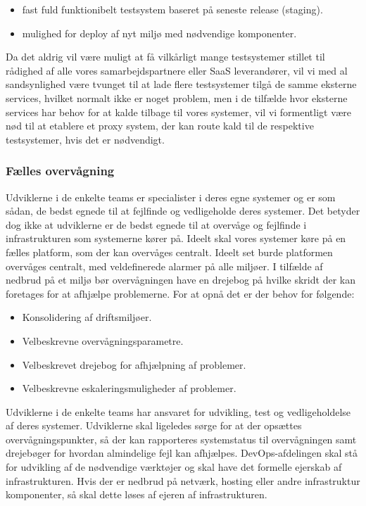 \documentclass{article}
\begin{document}
\begin{itemize}
    \item fast fuld funktionibelt testsystem baseret på seneste release (staging).
    \item mulighed for deploy af nyt miljø med nødvendige komponenter.
\end{itemize}

Da det aldrig vil være muligt at få vilkårligt mange testsystemer stillet til rådighed af alle vores samarbejdspartnere eller SaaS leverandører, vil vi med al sandsynlighed være tvunget til at lade flere testsystemer tilgå de samme eksterne services, hvilket normalt ikke er noget problem, men i de tilfælde hvor eksterne services har behov for at kalde tilbage til vores systemer, vil vi formentligt være nød til at etablere et proxy system, der kan route kald til de respektive testsystemer, hvis det er nødvendigt.


\subsubsection{Fælles overvågning}
Udviklerne i de enkelte teams er specialister i deres egne systemer og er som sådan, de bedst egnede til at fejlfinde og vedligeholde deres systemer. Det betyder dog ikke at udviklerne er de bedst egnede til at overvåge og fejlfinde i infrastrukturen som systemerne kører på. Ideelt skal vores systemer køre på en fælles platform, som der kan overvåges centralt.
Ideelt set burde platformen overvåges centralt, med veldefinerede alarmer på alle miljøer. I tilfælde af nedbrud på et miljø bør overvågningen have en drejebog på hvilke skridt der kan foretages for at afhjælpe problemerne.
For at opnå det er der behov for følgende:
\begin{itemize}
\item Konsolidering af driftsmiljøer.
\item Velbeskrevne overvågningsparametre.
\item Velbeskrevet drejebog for afhjælpning af problemer.
\item Velbeskrevne eskaleringsmuligheder af problemer.
\end{itemize}

Udviklerne i de enkelte teams har ansvaret for udvikling, test og vedligeholdelse af deres systemer. Udviklerne skal ligeledes sørge for at der opsættes overvågningspunkter, så der kan rapporteres systemstatus til overvågningen samt drejebøger for hvordan almindelige fejl kan afhjælpes.
DevOps-afdelingen skal stå for udvikling af de nødvendige værktøjer og skal have det formelle ejerskab af infrastrukturen. Hvis der er nedbrud på netværk, hosting eller andre infrastruktur komponenter, så skal dette løses af ejeren af infrastrukturen.
\end{document}
